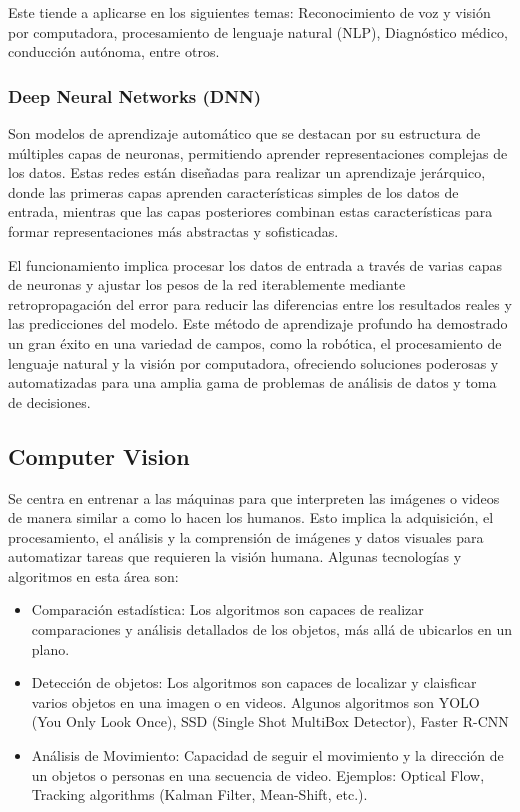 Este tiende a aplicarse en los siguientes temas: Reconocimiento de voz y visión por computadora, procesamiento de lenguaje natural (NLP), Diagnóstico médico, conducción autónoma, entre otros.


\subsubsection{Deep Neural Networks (DNN)}
Son modelos de aprendizaje automático que se destacan por su estructura de múltiples capas de neuronas, permitiendo aprender representaciones complejas de los datos. Estas redes están diseñadas para realizar un aprendizaje jerárquico, donde las primeras capas aprenden características simples de los datos de entrada, mientras que las capas posteriores combinan estas características para formar representaciones más abstractas y sofisticadas.

El funcionamiento implica procesar los datos de entrada a través de varias capas de neuronas y ajustar los pesos de la red iterablemente mediante retropropagación del error para reducir las diferencias entre los resultados reales y las predicciones del modelo. Este método de aprendizaje profundo ha demostrado un gran éxito en una variedad de campos, como la robótica, el procesamiento de lenguaje natural y la visión por computadora, ofreciendo soluciones poderosas y automatizadas para una amplia gama de problemas de análisis de datos y toma de decisiones.








\subsection{Computer Vision}
Se centra en entrenar a las máquinas para que interpreten las imágenes o videos de manera similar a como lo hacen los humanos. Esto implica la adquisición, el procesamiento, el análisis y la comprensión de imágenes y datos visuales para automatizar tareas que requieren la visión humana.
Algunas tecnologías y algoritmos en esta área son:
\newcommand{\CVone}{ Comparación estadística: Los algoritmos son capaces de  realizar comparaciones y análisis detallados de los objetos, más allá de ubicarlos en un plano.}
\newcommand{\CVtwo}{Detección de objetos: Los algoritmos son capaces de localizar y claisficar varios objetos en una imagen o en videos. Algunos algoritmos son YOLO (You Only Look Once), SSD (Single Shot MultiBox Detector), Faster R-CNN }
\newcommand{\CVthree}{ Análisis de Movimiento: Capacidad de seguir el movimiento y la dirección de un objetos o personas en una secuencia de video. Ejemplos: Optical Flow, Tracking algorithms (Kalman Filter, Mean-Shift, etc.). }

\begin{itemize}
	\item \CVone
	\item \CVtwo
	\item \CVthree
\end{itemize}
